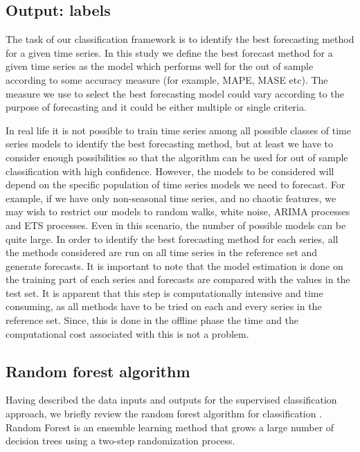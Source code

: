 \documentclass[11pt,a4paper,]{article}
\theoremstyle{definition}
\theoremstyle{definition}
\theoremstyle{definition}
\theoremstyle{remark}
\begin{document}
\subsection{Output: labels}\label{output-labels}

The task of our classification framework is to identify the best
forecasting method for a given time series. In this study we define the
best forecast method for a given time series as the model which performs
well for the out of sample according to some accuracy measure (for
example, MAPE, MASE etc). The measure we use to select the best
forecasting model could vary according to the purpose of forecasting and
it could be either multiple or single criteria.

In real life it is not possible to train time series among all possible
classes of time series models to identify the best forecasting method,
but at least we have to consider enough possibilities so that the
algorithm can be used for out of sample classification with high
confidence. However, the models to be considered will depend on the
specific population of time series models we need to forecast. For
example, if we have only non-seasonal time series, and no chaotic
features, we may wish to restrict our models to random walks, white
noise, ARIMA processes and ETS processes. Even in this scenario, the
number of possible models can be quite large. In order to identify the
best forecasting method for each series, all the methods considered are
run on all time series in the reference set and generate forecasts. It
is important to note that the model estimation is done on the training
part of each series and forecasts are compared with the values in the
test set. It is apparent that this step is computationally intensive and
time consuming, as all methods have to be tried on each and every series
in the reference set. Since, this is done in the offline phase the time
and the computational cost associated with this is not a problem.

\subsection{Random forest algorithm}\label{random-forest-algorithm}

Having described the data inputs and outputs for the supervised
classification approach, we briefly review the random forest algorithm
for classification \autocite{breiman2001random}. Random Forest is an
ensemble learning method that grows a large number of decision trees
using a two-step randomization process.
\end{document}
